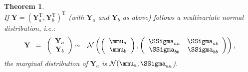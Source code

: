 \documentclass[a4paper]{article}
\theoremstyle{myexamplestyle}
\newtheorem{ther}{Theorem}
\begin{document}
\begin{ther} \label{theo.margDistMultivarNormal} \mbox{ }
\\
If $\mathbf{Y} = (\mathbf{Y}_a^{\mathrm{T}}, \mathbf{Y}_b^{\mathrm{T}})^{\mathrm{T}}$ (with $\mathbf{Y}_a$ and $\mathbf{Y}_b$ as above) follows a multivariate normal distribution, i.e.:
\begin{eqnarray*}
\mathbf{Y} \, \, \, = \, \, \,
\left(
\begin{array}{c}
\mathbf{Y}_a
\\
\mathbf{Y}_b
\end{array}
\right)
& \sim & \mathcal{N} \left(
\left(
\begin{array}{c}
\mmu_a
\\
\mmu_b
\end{array}
\right),
\left(
\begin{array}{cc}
\SSigma_{aa} & \SSigma_{ab}
\\
\SSigma_{bb} & \SSigma_{bb}
\end{array}
\right)
\right),
\end{eqnarray*}
the marginal distribution of $\mathbf{Y}_a$ is $\mathcal{N}(\mmu_a, \SSigma_{aa}$).
\end{ther}
\end{document}
